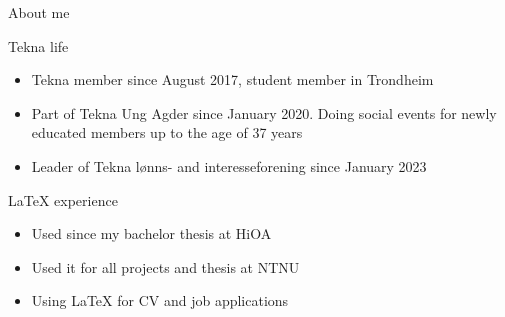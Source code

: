 \begin{frame}{About me}

\begin{alertblock}{Tekna life}
\begin{itemize}
    \item Tekna member since August 2017, student member in Trondheim
    \item Part of Tekna Ung Agder since January 2020. Doing social events for newly educated members up to the age of 37 years
    \item Leader of Tekna lønns- and interesseforening since January 2023
\end{itemize}
\end{alertblock}

\begin{block}{\LaTeX{} experience}
\begin{itemize}
    \item Used since my bachelor thesis at HiOA
    \item Used it for all projects and thesis at NTNU
    \item Using \LaTeX{} for CV and job applications
\end{itemize}
\end{block}

\end{frame}
